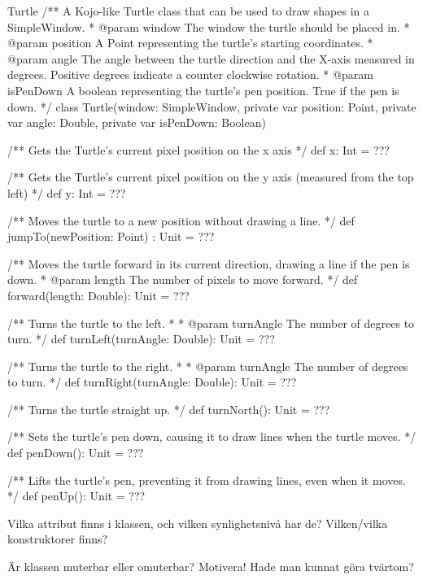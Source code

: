 \begin{ScalaSpec}{Turtle}
/** A Kojo-like Turtle class that can be used to draw shapes
    in a SimpleWindow.
  * @param window     The window the turtle should be placed in.
  * @param position   A Point representing the turtle's starting
                      coordinates.
  * @param angle      The angle between the turtle direction and
                      the X-axis measured in degrees. 
                      Positive degrees indicate a counter clockwise rotation.
  * @param isPenDown  A boolean representing the turtle's pen
                      position. True if the pen is down.
  */
class Turtle(window: SimpleWindow, private var position: Point,
      private var angle: Double, private var isPenDown: Boolean) {

  /** Gets the Turtle's current pixel position on the x axis */
  def x: Int = ???

  /** Gets the Turtle's current pixel position on the y axis
      (measured from the top left) */
  def y: Int = ???

  /** Moves the turtle to a new position without drawing a line. */
  def jumpTo(newPosition: Point) : Unit = ???

  /** Moves the turtle forward in its current direction, drawing
      a line if the pen is down.
    * @param length The number of pixels to move forward.  */
  def forward(length: Double): Unit = ???

  /** Turns the turtle to the left.
    *
    * @param turnAngle The number of degrees to turn. */
  def turnLeft(turnAngle: Double): Unit = ???

  /** Turns the turtle to the right.
    *
    * @param turnAngle The number of degrees to turn. */
  def turnRight(turnAngle: Double): Unit = ???

  /** Turns the turtle straight up. */
  def turnNorth(): Unit = ???

  /** Sets the turtle's pen down, causing it to draw lines when
      the turtle moves. */
  def penDown(): Unit = ???

  /** Lifts the turtle's pen, preventing it from drawing lines,
      even when it moves. */
  def penUp(): Unit = ???
}

\end{ScalaSpec}



\Subtask Vilka attribut finns i klassen, och vilken synlighetsnivå har de? Vilken/vilka konstruktorer finns? 

\Subtask Är klassen muterbar eller omuterbar? Motivera! Hade man kunnat göra tvärtom?

